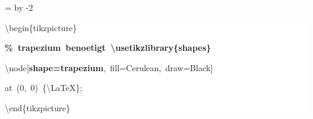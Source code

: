 \begingroup
\ttfamily
{}
=\textwidth
\advance{} by -2\fboxsep
\noindent
\colorbox{background}
{%
\parbox{\dimen255}
{%
\rule[-0.5ex]{0pt}{2.5ex}\hspace*{0.0em}\textbackslash{}begin\{tikzpicture\}\\
\rule[-0.5ex]{0pt}{2.5ex}\hspace*{1.0em}\textcolor{G}{\textbf{\%~trapezium~benoetigt~\textbackslash{}usetikzlibrary\{shapes\}}}\\
\rule[-0.5ex]{0pt}{2.5ex}\hspace*{1.0em}\textbackslash{}node[\textcolor{R}{\textbf{shape=trapezium}},~fill=Cerulean,~draw=Black]\\
\rule[-0.5ex]{0pt}{2.5ex}\hspace*{3.5em}at~(0,~0)~\{\textbackslash{}LaTeX\};\\
\rule[-0.5ex]{0pt}{2.5ex}\hspace*{0.0em}\textbackslash{}end\{tikzpicture\}}%
}%
\endgroup
